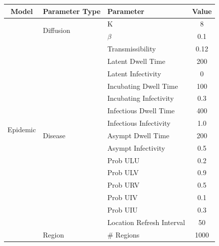 \documentclass[11pt]{book}
\begin{document}
\begin{figure}
    \begin{center}
        \begin{tabular}{|| c | l | l | c ||}
            \hline
            Model & Parameter Type & Parameter & Value \\ [0.5ex]
            \hline\hline
            \multirow{26}{*}{Epidemic}
                & \multirow{2}{*}{Diffusion}    & K                         & 8     \\
                &                               & $\beta$                   & 0.1   \\ \cline{2-4}
                & \multirow{15}{*}{Disease}     & Transmissibility          & 0.12  \\
                &                               & Latent Dwell Time         & 200   \\
                &                               & Latent Infectivity        & 0     \\
                &                               & Incubating Dwell Time     & 100   \\
                &                               & Incubating Infectivity    & 0.3   \\
                &                               & Infectious Dwell Time     & 400   \\
                &                               & Infectious Infectivity    & 1.0   \\
                &                               & Asympt Dwell Time         & 200   \\
                &                               & Asympt Infectivity        & 0.5   \\
                &                               & Prob ULU                  & 0.2   \\
                &                               & Prob ULV                  & 0.9   \\
                &                               & Prob URV                  & 0.5   \\
                &                               & Prob UIV                  & 0.1   \\
                &                               & Prob UIU                  & 0.3   \\
                &                               & Location Refresh Interval & 50    \\ \cline{2-4}
                & \multirow{3}{*}{Region}       & \# Regions                & 1000  \\

\end{tabular}
\end{center}
\end{figure}
\end{document}
